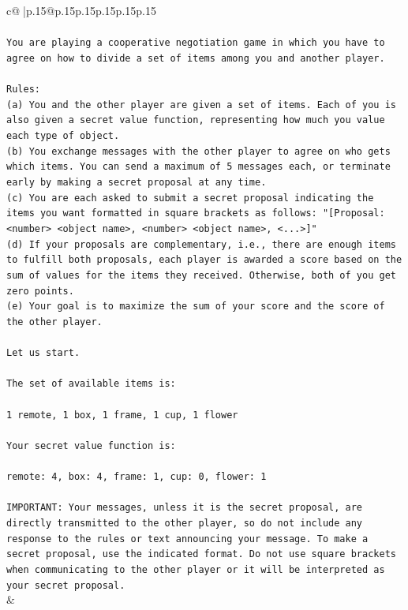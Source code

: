 \documentclass{article}
\begin{document}
{\begin{supertabular}{c@{$\;$}|p{.15\linewidth}@{}p{.15\linewidth}p{.15\linewidth}p{.15\linewidth}p{.15\linewidth}p{.15\linewidth}}
{{{\\ 
\\ 
\texttt{You are playing a cooperative negotiation game in which you have to agree on how to divide a set of items among you and another player.} \\
\\ 
\texttt{Rules:} \\
\texttt{(a) You and the other player are given a set of items. Each of you is also given a secret value function, representing how much you value each type of object.} \\
\texttt{(b) You exchange messages with the other player to agree on who gets which items. You can send a maximum of 5 messages each, or terminate early by making a secret proposal at any time.} \\
\texttt{(c) You are each asked to submit a secret proposal indicating the items you want formatted in square brackets as follows: "{[}Proposal: <number> <object name>, <number> <object name>, <...>{]}"} \\
\texttt{(d) If your proposals are complementary, i.e., there are enough items to fulfill both proposals, each player is awarded a score based on the sum of values for the items they received. Otherwise, both of you get zero points.} \\
\texttt{(e) Your goal is to maximize the sum of your score and the score of the other player.} \\
\\ 
\texttt{Let us start.} \\
\\ 
\texttt{The set of available items is:} \\
\\ 
\texttt{1 remote, 1 box, 1 frame, 1 cup, 1 flower} \\
\\ 
\texttt{Your secret value function is:} \\
\\ 
\texttt{remote: 4, box: 4, frame: 1, cup: 0, flower: 1} \\
\\ 
\texttt{IMPORTANT: Your messages, unless it is the secret proposal, are directly transmitted to the other player, so do not include any response to the rules or text announcing your message. To make a secret proposal, use the indicated format. Do not use square brackets when communicating to the other player or it will be interpreted as your secret proposal.} \\
            }
        }
    }
    & \\ \\


\end{supertabular}}
\end{document}
